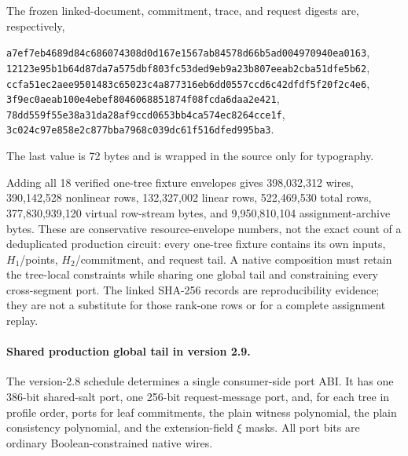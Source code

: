 \documentclass[11pt]{article}
\begin{document}
The frozen linked-document, commitment, trace, and request digests are,
respectively,
\begin{center}
\texttt{a7ef7eb4689d84c686074308d0d167e1567ab84578d66b5ad004970940ea0163},\\
\texttt{12123e95b1b64d87da7a575dbf803fc53ded9eb9a23b807eeab2cba51dfe5b62},\\
\texttt{ccfa51ec2aee9501483c65023c4a877316eb6dd0557ccd6c42dfdf5f20f2c4e6},\\
\texttt{3f9ec0aeab100e4ebef8046068851874f08fcda6daa2e421},\\
\texttt{78dd559f55e38a31da28af9ccd0653bb4ca574ec8264cce1f},\\
\texttt{3c024c97e858e2c877bba7968c039dc61f516dfed995ba3}.
\end{center}
The last value is 72 bytes and is wrapped in the source only for typography.

Adding all 18 verified one-tree fixture envelopes gives 398,032,312 wires,
390,142,528 nonlinear rows, 132,327,002 linear rows, 522,469,530 total rows,
377,830,939,120 virtual row-stream bytes, and 9,950,810,104 assignment-archive
bytes.  These are conservative resource-envelope numbers, not the exact count
of a deduplicated production circuit: every one-tree fixture contains its own
inputs, $H_1$/points, $H_2$/commitment, and request tail.  A native composition
must retain the tree-local constraints while sharing one global tail and
constraining every cross-segment port.  The linked SHA-256 records are
reproducibility evidence; they are not a substitute for those rank-one rows or
for a complete assignment replay.

\paragraph{Shared production global tail in version 2.9.}
The version-2.8 schedule determines a single consumer-side port ABI.  It has
one 386-bit shared-salt port, one 256-bit request-message port, and, for each
tree in profile order, ports for leaf commitments, the plain witness
polynomial, the plain consistency polynomial, and the extension-field
$\xi$ masks.  All port bits are ordinary Boolean-constrained native wires.
\end{document}
